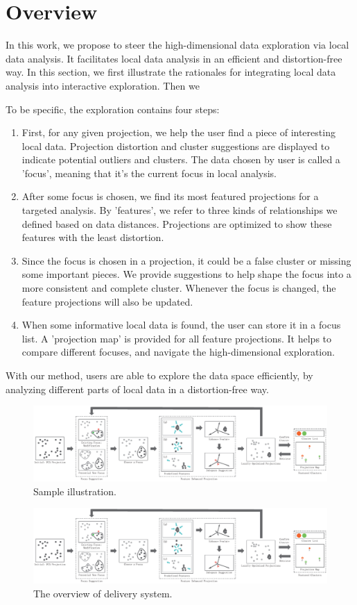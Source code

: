 \section{Overview}
In this work, we propose to steer the high-dimensional data exploration via local data analysis. It facilitates local data analysis in an efficient and distortion-free way.  In this section, we first illustrate the rationales for integrating local data analysis into interactive exploration. Then we

To be specific, the exploration contains four steps:
\begin{enumerate}[(1)]
 \item First, for any given projection, we help the user find a piece of interesting local data. Projection distortion and cluster suggestions are displayed to indicate potential outliers and clusters. The data chosen by user is called a 'focus', meaning that it's the current focus in local analysis.
 \item After some focus is chosen, we find its most featured projections for a targeted analysis. By 'features', we refer to three kinds of relationships we defined based on data distances. Projections are optimized to show these features with the least distortion.
 \item Since the focus is chosen in a projection, it could be a false cluster or missing some important pieces. We provide suggestions to help shape the focus into a more consistent and complete cluster. Whenever the focus is changed, the feature projections will also be updated.
 \item When some informative local data is found, the user can store it in a focus list. A 'projection map' is provided for all feature projections. It helps to compare different focuses, and navigate the high-dimensional exploration.
\end{enumerate}
 With our method, users are able to explore the data space efficiently, by analyzing different parts of local data in a distortion-free way.

\ifx
\begin{figure}[htb]
\centering
\includegraphics{images/Pipeline.eps}
\caption{Sample illustration.}
\end{figure}
\else
\begin{figure}[htbp]
\centering
  \includegraphics[width=1\linewidth]{images/Pipeline.eps}%
  \caption{The overview of delivery system.}\label{fig.2}
  \end{figure}
  \fi